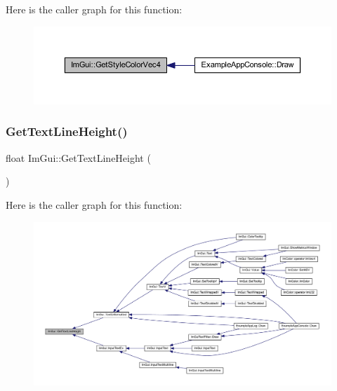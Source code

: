Here is the caller graph for this function\+:
\nopagebreak
\begin{figure}[H]
\begin{center}
\leavevmode
\includegraphics[width=350pt]{namespace_im_gui_ad838e580972e2c4b3da2b0f60754b662_icgraph}
\end{center}
\end{figure}
\mbox{\label{namespace_im_gui_aaba5637199d31ea23d4d143b30a44aff}} 
\subsubsection{\texorpdfstring{Get\+Text\+Line\+Height()}{GetTextLineHeight()}}
{\footnotesize\ttfamily float Im\+Gui\+::\+Get\+Text\+Line\+Height (\begin{DoxyParamCaption}{ }\end{DoxyParamCaption})}

Here is the caller graph for this function\+:
\nopagebreak
\begin{figure}[H]
\begin{center}
\leavevmode
\includegraphics[width=350pt]{namespace_im_gui_aaba5637199d31ea23d4d143b30a44aff_icgraph}
\end{center}
\end{figure}
\mbox{\label{namespace_im_gui_aa1616f6082fd210fde8d98c511bf8f56}} 
